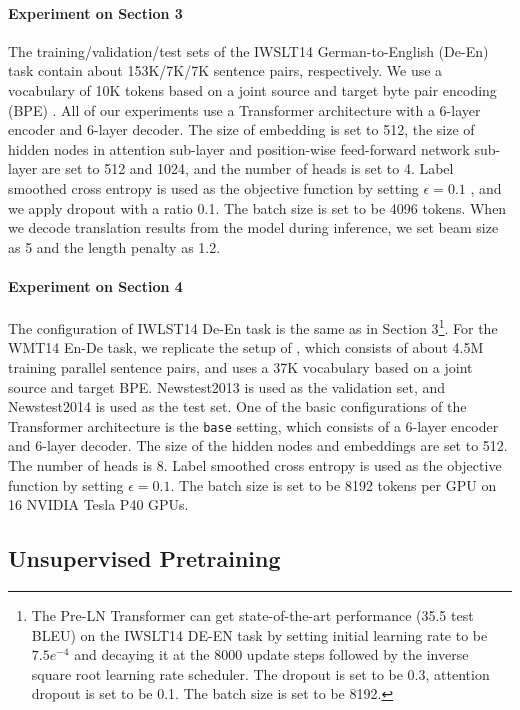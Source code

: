 \documentclass{article}
\begin{document}
\paragraph{Experiment on Section 3}
The training/validation/test sets of the IWSLT14 German-to-English (De-En) task contain about 153K/7K/7K sentence pairs, respectively. We use a vocabulary of 10K tokens based on a joint source and target byte pair encoding (BPE) \citep{sennrich2015neural}. All of our experiments use a Transformer architecture with a 6-layer encoder and 6-layer decoder. The size of embedding is set to 512, the size of hidden nodes in attention sub-layer and position-wise feed-forward network sub-layer are set to 512 and 1024, and the number of heads is set to 4. Label smoothed cross entropy is used as the objective function by setting $\epsilon = 0.1$ \citep{szegedy2016rethinking}, and we apply dropout with a ratio 0.1. The batch size is set to be 4096 tokens. When we decode translation results from the model during inference, we set beam size as 5 and the length penalty as 1.2.

\paragraph{Experiment on Section 4}
The configuration of IWLST14 De-En task is the same as in Section 3\footnote{The Pre-LN Transformer can get state-of-the-art performance (35.5 test BLEU) on the IWSLT14 DE-EN task by setting initial learning rate to be $7.5e^{-4}$ and decaying it at the 8000 update steps followed by the inverse square root learning rate scheduler. The dropout is set to be 0.3, attention dropout is set to be 0.1. The batch size is set to be 8192.}.
For the WMT14 En-De task, we replicate the setup of \citep{vaswani2017attention}, which consists of about 4.5M training parallel sentence pairs, and uses a 37K vocabulary based on a joint source and target BPE. Newstest2013 is used as the validation set, and Newstest2014 is used as the test set. One of the basic configurations of the Transformer architecture is the \texttt{base} setting, which consists of a 6-layer encoder and 6-layer decoder. The size of the hidden nodes and embeddings are set to 512. The number of heads is 8. Label smoothed cross entropy is used as the objective function by setting $\epsilon= 0.1$. The batch size is set to be 8192 tokens per GPU on 16 NVIDIA Tesla P40 GPUs.

\subsection{Unsupervised Pretraining}
\end{document}
